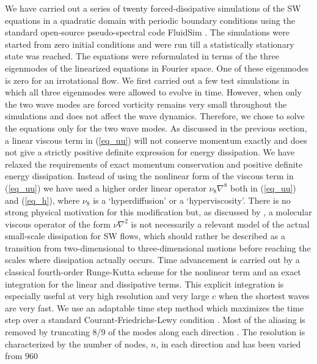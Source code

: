 We have carried out a series of twenty forced-dissipative simulations of the SW
equations in a quadratic domain with periodic boundary conditions using the
standard open-source pseudo-spectral code FluidSim \cite[]{fluiddyn, fluidfft,
fluidsim}.
%
The simulations were started from zero initial
conditions and were run till a statistically stationary state was reached. The
equations were reformulated in terms of the three eigenmodes of the linearized
equations in Fourier space. One of these eigenmodes is zero for an irrotational
flow. We first carried out a few test simulations in which all three eigenmodes
were allowed to evolve in time. However, when only the two wave modes are
forced vorticity remains very small throughout the simulations and does not
affect the wave dynamics. Therefore, we chose to solve the equations only for
the two wave modes. As discussed in the previous section, a linear viscous term
in (\ref{eq_uu}) will not conserve momentum exactly and does not give a
strictly positive definite expression for energy dissipation. We have relaxed
the requirements of exact momentum conservation and positive definite energy
dissipation. Instead of using the nonlinear form of the viscous term in
(\ref{eq_uu}) we have used a higher order linear operator $ \nu_8 \nabla^{8} $
both in (\ref{eq_uu}) and (\ref{eq_h}), where $ \nu_8 $ is a `hyperdiffusion'
or a `hyperviscosity'. There is no strong physical motivation for this
modification but, as discussed by \cite{FargeSadourny1989}, a molecular viscous
operator of the form $\nu \nabla^2 $ is not necessarily a relevant model of the
actual small-scale dissipation for SW flows, which should rather be described
as a transition from two-dimensional to three-dimensional motions before
reaching the scales where dissipation actually occurs.
%
Time advancement is carried out by a classical fourth-order Runge-Kutta scheme
for the nonlinear term and an exact integration for the linear and dissipative
terms. This explicit integration is especially useful at very high resolution
and very large $c$ when the shortest waves are very fast. We use an adaptable
time step method which maximizes the time step over a standard
Courant-Friedrichs-Lewy condition \cite[]{Lundbladh1999,
AugierChomazBillant2012}.
%
Most of the aliasing is removed by truncating 8/9 of the modes along each
direction \cite[for a detail discussion on the issues of the non-conservation
of the non-quadratic energy and the aliasing errors in the truncated one-layer
shallow water model, see][]{FargeSadourny1989}. The resolution is characterized
by the number of nodes, $n$, in each direction and has been varied from 960
